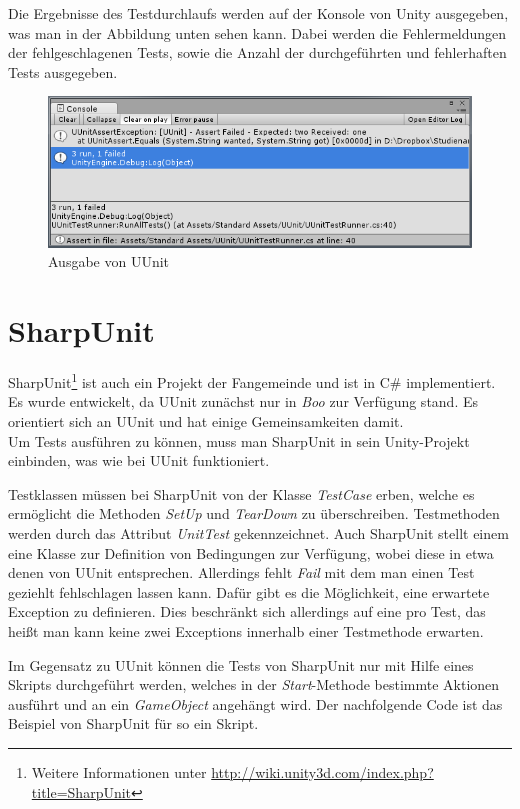 Die Ergebnisse des Testdurchlaufs werden auf der Konsole von Unity ausgegeben, was man in der Abbildung unten sehen kann. Dabei werden die Fehlermeldungen der fehlgeschlagenen Tests, sowie die Anzahl der durchgeführten und fehlerhaften Tests ausgegeben.

\begin{figure}[h]
\centering
\includegraphics[width=1\linewidth]{./images/Kapitel_UnitTestsMitUnity/UUnit_Konsolenausgabe}
\caption[Ausgabe von UUnit]{Ausgabe von UUnit}
\label{fig:UUnit_Konsolenausgabe}
\end{figure}

\section{SharpUnit}\label{sec:SharpUnit}

SharpUnit\footnote{Weitere Informationen unter \url{http://wiki.unity3d.com/index.php?title=SharpUnit}} ist auch ein Projekt der Fangemeinde und ist in C\# implementiert. Es wurde entwickelt, da UUnit zunächst nur in \textit{Boo} zur Verfügung stand. Es orientiert sich an UUnit und hat einige Gemeinsamkeiten damit.\\
Um Tests ausführen zu können, muss man SharpUnit in sein Unity-Projekt einbinden, was wie bei UUnit funktioniert.

Testklassen müssen bei SharpUnit von der Klasse \textit{TestCase} erben, welche es ermöglicht die Methoden \textit{SetUp} und \textit{TearDown} zu überschreiben. Testmethoden werden durch das Attribut \textit{UnitTest} gekennzeichnet. Auch SharpUnit stellt einem eine Klasse zur Definition von Bedingungen zur Verfügung, wobei diese in etwa denen von UUnit entsprechen. Allerdings fehlt \textit{Fail} mit dem man einen Test geziehlt fehlschlagen lassen kann. Dafür gibt es die Möglichkeit, eine erwartete Exception zu definieren. Dies beschränkt sich allerdings auf eine pro Test, das heißt man kann keine zwei Exceptions innerhalb einer Testmethode erwarten.
 
Im Gegensatz zu UUnit können die Tests von SharpUnit nur mit Hilfe eines Skripts durchgeführt werden, welches in der \textit{Start}-Methode bestimmte Aktionen ausführt und an ein \textit{GameObject} angehängt wird. Der nachfolgende Code ist das Beispiel von SharpUnit für so ein Skript.

